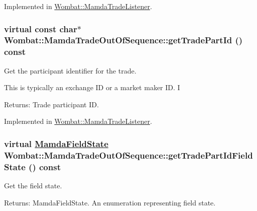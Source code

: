 Implemented in \hyperlink{classWombat_1_1MamdaTradeListener_5fa909b1c87c6380e204dba43ab9baa7}{Wombat::Mamda\-Trade\-Listener}.\hypertarget{classWombat_1_1MamdaTradeOutOfSequence_96b795f0456fc3b4f706b6688898e27f}{
\subsubsection[getTradePartId]{\setlength{\rightskip}{0pt plus 5cm}virtual const char$\ast$ Wombat::Mamda\-Trade\-Out\-Of\-Sequence::get\-Trade\-Part\-Id () const}}
\label{classWombat_1_1MamdaTradeOutOfSequence_96b795f0456fc3b4f706b6688898e27f}


Get the participant identifier for the trade. 

This is typically an exchange ID or a market maker ID. I

\begin{Desc}
\item[Returns:]Trade participant ID. \end{Desc}


Implemented in \hyperlink{classWombat_1_1MamdaTradeListener_a9e5a20840963992b58ec19cf717cfab}{Wombat::Mamda\-Trade\-Listener}.\hypertarget{classWombat_1_1MamdaTradeOutOfSequence_9619c7b6e64c238b0a56171bcb2442a4}{
\subsubsection[getTradePartIdFieldState]{\setlength{\rightskip}{0pt plus 5cm}virtual \hyperlink{namespaceWombat_93aac974f2ab713554fd12a1fa3b7d2a}{Mamda\-Field\-State} Wombat::Mamda\-Trade\-Out\-Of\-Sequence::get\-Trade\-Part\-Id\-Field\-State () const}}
\label{classWombat_1_1MamdaTradeOutOfSequence_9619c7b6e64c238b0a56171bcb2442a4}


Get the field state. 

\begin{Desc}
\item[Returns:]Mamda\-Field\-State. An enumeration representing field state. \end{Desc}



